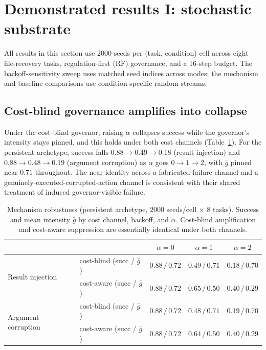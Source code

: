 \documentclass[11pt]{article}
\begin{document}
\section{Demonstrated results I: stochastic substrate}
\label{sec:stochastic}

All results in this section use $2000$ seeds per (task, condition) cell
across eight file-recovery tasks, regulation-first (RF) governance, and a 16-step
budget. The backoff-sensitivity sweep uses matched seed indices across modes;
the mechanism and baseline comparisons use condition-specific random streams.

\subsection{Cost-blind governance amplifies into collapse}
\label{sec:amplification}

Under the cost-blind governor, raising $\alpha$ collapses success while the
governor's intensity stays pinned, and this holds under both cost channels
(Table~\ref{tab:mechanisms}). For the persistent archetype, success falls
$0.88\to0.49\to0.18$ (result injection) and $0.88\to0.48\to0.19$ (argument
corruption) as $\alpha$ goes $0\to1\to2$, with $\bar g$ pinned near $0.71$
throughout. The near-identity across a fabricated-failure channel and a
genuinely-executed-corrupted-action channel is consistent with their shared treatment of
induced governor-visible failure.

\begin{table}[t]
\centering
\caption{Mechanism robustness (persistent archetype, $2000$ seeds/cell $\times$
$8$ tasks). Success and mean intensity $\bar g$ by cost channel, backoff, and
$\alpha$. Cost-blind amplification and cost-aware suppression are essentially
identical under both channels.}
\label{tab:mechanisms}
\begin{tabular}{llccc}
\toprule
 & & $\alpha{=}0$ & $\alpha{=}1$ & $\alpha{=}2$ \\
\midrule
\multirow{2}{*}{Result injection}
 & cost-blind (succ / $\bar g$)  & $0.88\,/\,0.72$ & $0.49\,/\,0.71$ & $0.18\,/\,0.70$ \\
 & cost-aware (succ / $\bar g$)  & $0.88\,/\,0.72$ & $0.65\,/\,0.50$ & $0.40\,/\,0.29$ \\
\midrule
\multirow{2}{*}{Argument corruption}
 & cost-blind (succ / $\bar g$)  & $0.88\,/\,0.72$ & $0.48\,/\,0.71$ & $0.19\,/\,0.70$ \\
 & cost-aware (succ / $\bar g$)  & $0.88\,/\,0.72$ & $0.64\,/\,0.50$ & $0.40\,/\,0.29$ \\
\bottomrule
\end{tabular}
\end{table}
\end{document}
